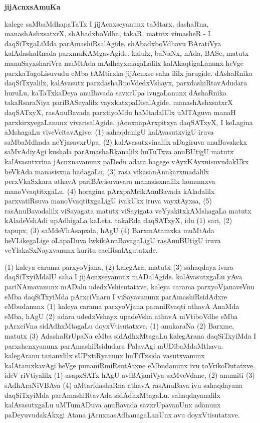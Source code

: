 \bigskip
\begin{center}
{\Large\bf jijAcnxsAmuKa}
\end{center}

kalege saMbaMdhapaTaTx I jijAcnxseyanunx taMtarx, dashaRna, manashAshxsatxrX, shAbadxboVdha, takaR, matutx vimasheR - I daqSiTxgaLiMda parAmashiRsalAgide. shAbadxboVdhavu BAratiVya kalAdashaRnada parxmuKAMgavAgide. kalulx, baNaNx, nAda, BASe, matutx manuSayxshariVra muMtAda mAdhayxmagaLalilx kalAkaqtigaLanunx heVge parxkaTagoLisuvudu eMba tAMtirxka jijAcnxse saha ililx jarugide. dAshaRnika daqSiTxyalilx, kalAvasutx parxdashaRnoVdedxVshayx, parxdashiRtavAdudara huruLu, kaTaTxkaDeya anuBavada savxrUpa ivugaLanunx dAshaRnika takaRsaraNiya pariBASeyalilx vayxkatxpaDisalAgide. manashAshxsatxrX daqSATxyX, rasAnuBavada parxtiyoMdu haMtadalUlx uMTAguva manaH parxkirxyegaLanunx vivarisalAgide. jAcnxnapArxpitxya daqSATxyX, I keLagina aMshagaLu viveVcitavAgive: (1) sahaqdanigU kalAvasutxvigU iruva saMbaMdhada neYjasavxrUpa, (2) kalAvasutxvinalilx aDagiruva anuBavakekx saMvAdiyAgi kushala parAmashaRkanalilx huTuTxva anuBUtigU matutx kalAvasutxvina jAcnxnavanunx paDedu adara bagege vAyxKAyxnisuvudakUkx beVkAda manasisxna hadagaLu, (3) rasa vikasanAnukarxmadalilx perxVkaSxkara athavA pariBAvisuvavara manasisxnalilx homumxva manoVvaqtitxgaLu. (4) horagina pArxpaMcikAnuBavada kAladalilx parxvatiRsuva manoVvaqtitxgaLigU ivakUkx iruva vayxtAyxsa, (5) rasAnuBavadalilx viSayagata matutx viSayigata veYyakitxkAMshagaLa matutx kAladeVshAdi upAdhigaLa kaLeta. takaRda daqSATxyX, idu (1) sari, (2) tapupx, (3) saMdeVhAsapxda, hAgU (4) BarxmAtamxka muMtAda heVLikegaLige oLapaDuva lwkikAnuBavagaLigU rasAnuBUtigU iruva veYlakaSxNayxvanunx kuritu caciRsalAgutatxde.

(1) kaleya carama parxyoVjana, (2) kalegAra, matutx (3) sahaqdaya ivara daqSiTxyiMdalU saha I jijAcnxseyanunx mADalAgide. kalAvasutxgaLu yAva pariNAmavanunx mADalu udedxVshisutatxve, kaleya carama parxyoVjanaveVnu eMba daqSiTxyiMda pArxciVnaru I viSayavanunx parAmashiRsidAdxre eMbudanunx (1) kaleya carama parxyoVjana paraniRvaqti athavA AnaMda eMba, hAgU (2) adara udedxVshayx upadeVsha athavA niVtiboVdhe eMba pArxciVna sidAdhxMtagaLu doyxVtisutatxve. (1) anukaraNa (2) Barxme, matutx (3) AdashaRrUpaNa eMba sidAdhxMtagaLu kalegArana daqSiTxyiMda I parxshenxyanunx parAmashiRsidudara PalavAgi mUDibaMdaMthavu. kalegAranu tananxlilx sUPxtiRyanunx huTiTxsida vasutxvanunx kalAtamxkavAgi heVge punaniRmiRsutAtxne eMbudanunx ivu toVrikoDutatxve. ideV riVtiyalilx (1) asapxSATx hAgU aviBAjaniVya saMveVdane, (2) anumiti (3) sAdhAraNiVBAva (4) aMtarfdashaRna athavA rasAnuBava ivu sahaqdayana daqSiTxyiMda parAmashiRtavAda sidAdhxMtagaLu. sahaqdayanalilx kalAvasutxgaLu uMTumADuva anuBavada savxrUpavanUnx adanunx paDeyuvudakAkxgi Atana jAcnxnasAdhanagaLanUnx avu doyxVtisutatxve.

